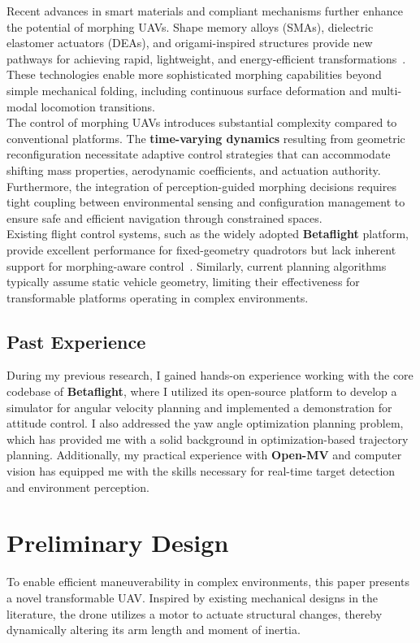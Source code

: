 \documentclass[11pt,a4paper]{article}
\begin{document}
\noindent
Recent advances in smart materials and compliant mechanisms further enhance the potential of morphing UAVs. Shape memory alloys (SMAs), dielectric elastomer actuators (DEAs), and origami-inspired structures provide new pathways for achieving rapid, lightweight, and energy-efficient transformations~\cite{du2023high,dufour2016drone}. These technologies enable more sophisticated morphing capabilities beyond simple mechanical folding, including continuous surface deformation and multi-modal locomotion transitions.\\
The control of morphing UAVs introduces substantial complexity compared to conventional platforms. The \textbf{time-varying dynamics} resulting from geometric reconfiguration necessitate adaptive control strategies that can accommodate shifting mass properties, aerodynamic coefficients, and actuation authority. Furthermore, the integration of perception-guided morphing decisions requires tight coupling between environmental sensing and configuration management to ensure safe and efficient navigation through constrained spaces.\\
Existing flight control systems, such as the widely adopted \textbf{Betaflight} platform, provide excellent performance for fixed-geometry quadrotors but lack inherent support for morphing-aware control~\cite{betaflight}. Similarly, current planning algorithms typically assume static vehicle geometry, limiting their effectiveness for transformable platforms operating in complex environments.

\subsection{Past Experience}
During my previous research, I gained hands-on experience working with the core codebase of \textbf{Betaflight}, where I utilized its open-source platform to develop a simulator for angular velocity planning and implemented a demonstration for attitude control. I also addressed the yaw angle optimization planning problem, which has provided me with a solid background in optimization-based trajectory planning. Additionally, my practical experience with \textbf{Open-MV} and computer vision has equipped me with the skills necessary for real-time target detection and environment perception.

\section{Preliminary Design}
To enable efficient maneuverability in complex environments, this paper presents a novel transformable UAV\@. Inspired by existing mechanical designs in the literature, the drone utilizes a motor to actuate structural changes, thereby dynamically altering its arm length and moment of inertia.
\end{document}
